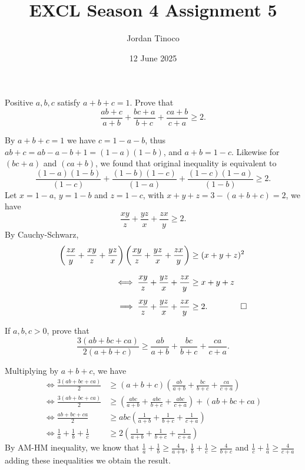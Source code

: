 \documentclass[12pt, paper=letter]{scrartcl}
\title {\Large EXCL Season 4 Assignment 5}
\date{12 June 2025}
\author{Jordan Tinoco}
\begin{document}
    \maketitle

    \begin{problem*}
        Positive $a,b,c$ satisfy $a + b + c = 1$.
        Prove that
        \[
            \frac{ab + c}{a + b} + \frac{bc + a}{b + c} + \frac{ca + b}{c + a} \geq 2.
        \]
    \end{problem*}
    \begin{solution*}
        By $a + b + c = 1$ we have $c = 1 - a - b$, thus $ab + c = ab - a - b + 1 = (1 - a)(1 - b)$, and $a + b = 1 - c$.
        Likewise for $(bc + a)$ and $(ca + b)$, we found that original inequality is equivalent to
        \[
            \frac{(1 - a)(1 - b)}{(1 - c)} + \frac{(1 - b)(1 - c)}{(1 - a)} + \frac{(1 - c)(1 - a)}{(1 - b)} \geq 2.
        \]
        Let $x = 1 - a$, $y = 1 - b$ and $z = 1 - c$, with $x + y + z = 3 - (a + b + c) = 2$, we have
        \[
            \frac{xy}{z} + \frac{yz}{x} + \frac{zx}{y} \geq 2.
        \]
        By Cauchy-Schwarz,
        \begin{align*}
            \left(\frac{zx}{y} + \frac{xy}{z} + \frac{yz}{x}\right)\left(\frac{xy}{z} + \frac{yz}{x} + \frac{zx}{y}\right) &\geq (x + y + z)^2\\[3mm]
            \iff \frac{xy}{z} + \frac{yz}{x} + \frac{zx}{y} &\geq x + y + z\\[2mm]
            \implies \frac{xy}{z} + \frac{yz}{x} + \frac{zx}{y} &\geq 2. \qquad \qedhere
        \end{align*}
    \end{solution*}

    \begin{problem*}
        If $a,b,c > 0$, prove that
        \[
            \frac{3(ab + bc + ca)}{2(a + b + c)} \geq \frac{ab}{a + b} + \frac{bc}{b + c} + \frac{ca}{c + a}.
        \]
    \end{problem*}
    \begin{solution*}
        Multiplying by $a + b + c$, we have
        \begin{align*}
            \iff \frac{3(ab + bc + ca)}{2} &\geq (a + b + c)\left(\frac{ab}{a + b} + \frac{bc}{b + c} + \frac{ca}{c + a}\right)\\[3mm]
            \iff \frac{3(ab + bc + ca)}{2} &\geq \left(\frac{abc}{a + b} + \frac{abc}{b + c} + \frac{abc}{c + a}\right) + (ab + bc + ca)\\[3mm]
            \iff \frac{ab + bc + ca}{2} &\geq abc\left(\frac{1}{a + b} + \frac{1}{b + c} + \frac{1}{c + a}\right)\\[3mm]
            \iff \frac{1}{a} + \frac{1}{b} + \frac{1}{c} &\geq 2\left(\frac{1}{a + b} + \frac{1}{b + c} + \frac{1}{c + a}\right)
        \end{align*}
        By AM-HM inequality, we know that $\frac{1}{a} + \frac{1}{b} \geq \frac{4}{a + b}$, $\frac{1}{b} + \frac{1}{c} \geq \frac{4}{b + c}$ and $\frac{1}{c} + \frac{1}{a} \geq \frac{4}{c + a}$ adding these inequalities we obtain the result.
    \end{solution*}
    
\end{document}
